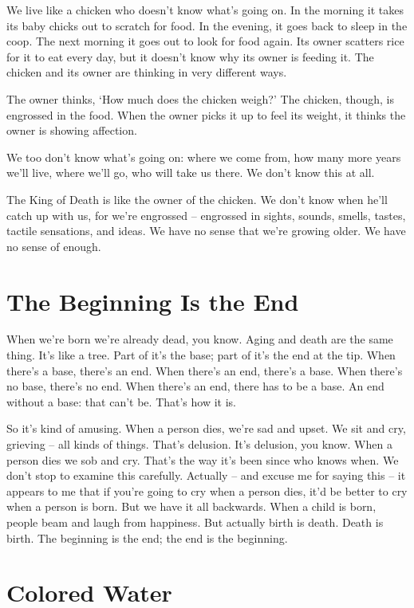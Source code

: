 We live like a chicken who doesn't know what's going on. In the morning it takes its baby chicks out to scratch for food. In the evening, it goes back to sleep in the coop. The next morning it goes out to look for food again. Its owner scatters rice for it to eat every day, but it doesn't know why its owner is feeding it. The chicken and its owner are thinking in very different ways.

The owner thinks, `How much does the chicken weigh?' The chicken, though, is engrossed in the food. When the owner picks it up to feel its weight, it thinks the owner is showing affection.

We too don't know what's going on: where we come from, how many more years we'll live, where we'll go, who will take us there. We don't know this at all.

The King of Death is like the owner of the chicken. We don't know when he'll catch up with us, for we're engrossed -- engrossed in sights, sounds, smells, tastes, tactile sensations, and ideas. We have no sense that we're growing older. We have no sense of enough.

\clearpage

\section{The Beginning Is the End}

When we're born we're already dead, you know. Aging and death are the same thing. It's like a tree. Part of it's the base; part of it's the end at the tip. When there's a base, there's an end. When there's an end, there's a base. When there's no base, there's no end. When there's an end, there has to be a base. An end without a base: that can't be. That's how it is.

So it's kind of amusing. When a person dies, we're sad and upset. We sit and cry, grieving -- all kinds of things. That's delusion. It's delusion, you know. When a person dies we sob and cry. That's the way it's been since who knows when. We don't stop to examine this carefully. Actually -- and excuse me for saying this -- it appears to me that if you're going to cry when a person dies, it'd be better to cry when a person is born. But we have it all backwards. When a child is born, people beam and laugh from happiness. But actually birth is death. Death is birth. The beginning is the end; the end is the beginning.

\clearpage

\section{Colored Water}

